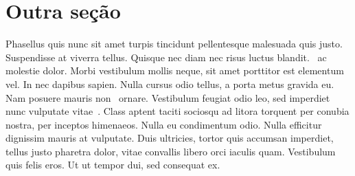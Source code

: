 \section{Outra seção}
Phasellus quis nunc sit amet turpis tincidunt pellentesque malesuada quis justo. Suspendisse at viverra tellus. Quisque nec diam nec risus luctus blandit.\  ac molestie dolor. Morbi vestibulum mollis neque, sit amet porttitor est elementum vel. In nec dapibus sapien. Nulla cursus odio tellus, a porta metus gravida eu. Nam posuere mauris non\  ornare. Vestibulum feugiat odio leo, sed imperdiet nunc vulputate vitae\ \cite{sinopse2019es}. Class aptent taciti sociosqu ad litora torquent per conubia nostra, per inceptos himenaeos. Nulla eu condimentum odio. Nulla efficitur dignissim mauris at vulputate. Duis ultricies, tortor quis accumsan imperdiet, tellus justo pharetra dolor, vitae convallis libero orci iaculis quam. Vestibulum quis felis eros. Ut ut tempor dui, sed consequat ex.
